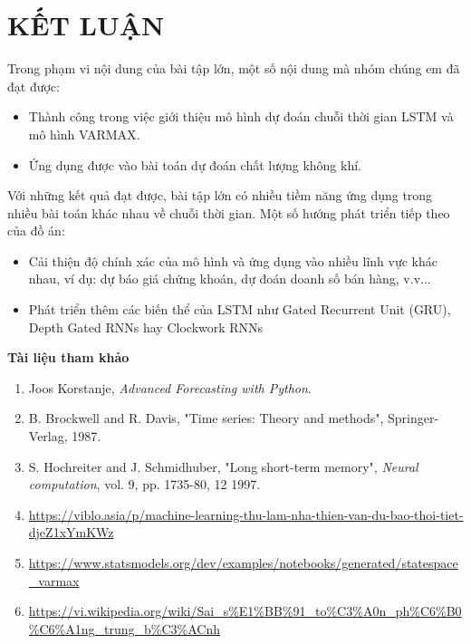\chapter{KẾT LUẬN}
Trong phạm vi nội dung của bài tập lớn, một số nội dung mà nhóm chúng em đã đạt được:
\begin{itemize}
    \item Thành công trong việc giới thiệu mô hình dự đoán chuỗi thời gian LSTM và mô hình VARMAX. 
    \item Ứng dụng được vào bài toán dự đoán chất lượng không khí.
\end{itemize}
Với những kết quả đạt được, bài tập lớn có nhiều tiềm năng ứng dụng trong nhiều bài toán khác nhau về chuỗi thời gian. Một số hướng phát triển tiếp theo của đồ án:
\begin{itemize}
    \item Cải thiện độ chính xác của mô hình và ứng dụng vào nhiều lĩnh vực khác nhau, ví dụ: dự báo giá chứng khoán, dự đoán doanh số bán hàng, v.v...
    \item Phát triển thêm các biến thể của LSTM như Gated Recurrent Unit (GRU), Depth Gated RNNs hay Clockwork RNNs
\end{itemize}


\newpage
\begin{center}
   \textbf{\LARGE{Tài liệu tham khảo}}
\end{center}
\begin{enumerate}
    \item Joos Korstanje, \textit{Advanced Forecasting with Python}.
    \item B. Brockwell and R. Davis, "Time series: Theory and methods", Springer-Verlag, 1987.
    \item S. Hochreiter and J. Schmidhuber, "Long short-term memory", \textit{Neural computation}, vol. 9, pp. 1735-80, 12 1997.
    \item \url{https://viblo.asia/p/machine-learning-thu-lam-nha-thien-van-du-bao-thoi-tiet-djeZ1xYmKWz}
    
    \item \url{https://www.statsmodels.org/dev/examples/notebooks/generated/statespace_varmax}
    
    \item \url{https://vi.wikipedia.org/wiki/Sai_s%E1%BB%91_to%C3%A0n_ph%C6%B0%C6%A1ng_trung_b%C3%ACnh}
\end{enumerate}

